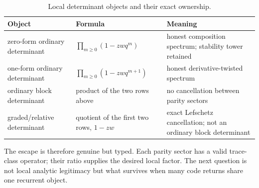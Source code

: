 \begin{table}[t]
\centering
\caption{Local determinant objects and their exact ownership.}
\label{tab:local-objects}
\small
\begin{tabularx}{\textwidth}{L{3.2cm}L{5.2cm}Y}
\toprule
Object & Formula & Meaning \\
\midrule
zero-form ordinary determinant
& $\prod_{m\ge0}(1-zwq^m)$
& honest composition spectrum; stability tower retained \\
one-form ordinary determinant
& $\prod_{m\ge0}(1-zwq^{m+1})$
& honest derivative-twisted spectrum \\
ordinary block determinant
& product of the two rows above
& no cancellation between parity sectors \\
graded/relative determinant
& quotient of the first two rows, $1-zw$
& exact Lefschetz cancellation; not an ordinary block determinant \\
\bottomrule
\end{tabularx}
\end{table}

The escape is therefore genuine but typed.  Each parity sector has a valid
trace-class operator; their ratio supplies the desired local factor.  The
next question is not local analytic legitimacy but what survives when many
code returns share one recurrent object.
